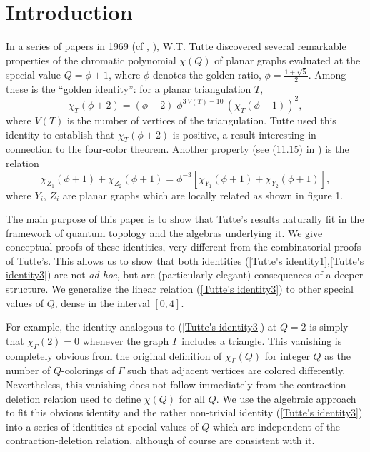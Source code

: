 \documentclass[11pt]{amsart}
\numberwithin{equation}{section}
\theoremstyle{definition}
\begin{document}
\maketitle



\section{Introduction}


In a series of papers in 1969 (cf \cite{T1}, \cite{T2}), W.T. Tutte
discovered several remarkable properties of the chromatic polynomial $\chi(Q)$
of planar graphs evaluated at the special value $Q={\phi}+1$,
where ${\phi}$ denotes the golden ratio, ${\phi}=\frac{1+\sqrt5}{2}$.
Among these is the ``golden identity'': for a planar triangulation $T$,
\begin{equation} \label{Tutte's identity1}
  {\chi}^{}_T({\phi}+2)=({\phi}+2)\; {\phi}^{3\,V(T)-10}\,
  ({\chi}^{}_T({\phi}+1))^2,
\end{equation}
where $V(T)$ is the number of vertices of the triangulation. Tutte used this identity
to establish that ${\chi}^{}_T({\phi}+2)$ is positive, a result interesting in connection
to the four-color theorem. Another
property (see (11.15) in \cite{T3}) is the relation
\begin{equation}
\label{Tutte's identity3}
{\chi}^{}_{Z_1}({\phi}+1)+{\chi}^{}_{Z_2}({\phi}+1)=
{\phi}^{-3}[{\chi}^{}_{Y_1}(\phi+1)+{\chi}^{}_{Y_2}({\phi}+1)],\end{equation}
where $Y_i$, $Z_i$ are planar graphs which are
locally related as shown in figure 1.

The main purpose of this paper is to show that Tutte's results
naturally fit in the framework of quantum topology and the algebras
underlying it. We give conceptual proofs of these identities, very
different from the combinatorial proofs of Tutte's. This allows us to
show that both identities (\ref{Tutte's identity1},\ref{Tutte's identity3})
are not {\it ad hoc}, but are (particularly elegant) consequences of a
deeper structure. We generalize the linear relation (\ref{Tutte's
identity3}) to other special values of $Q$, dense in the interval
$[0,4]$.

For example, the identity analogous to (\ref{Tutte's identity3}) at
$Q=2$ is simply that $\chi_\Gamma^{}(2)=0$ whenever the graph $\Gamma$
includes a triangle. This vanishing is completely obvious from the
original definition of $\chi_\Gamma(Q)$ for integer $Q$ as the number
of $Q$-colorings of $\Gamma$ such that adjacent vertices are colored
differently. Nevertheless, this vanishing does not follow immediately
from the contraction-deletion relation used to define $\chi(Q)$ for
all $Q$. We use the algebraic approach to fit this obvious identity
and the rather non-trivial identity (\ref{Tutte's identity3}) into a
series of identities at special values of $Q$ which are independent of
the contraction-deletion relation, although of course are consistent
with it.
\end{document}
